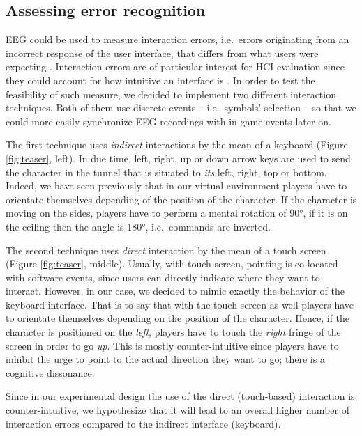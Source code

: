\documentclass[]{sigchi}
\begin{document}
\subsection{Assessing error
recognition}\label{assessing-error-recognition}

EEG could be used to measure interaction errors, i.e.~errors originating
from an incorrect response of the user interface, that differs from what
users were expecting \citep{Ferrez2008}. Interaction errors are of
particular interest for HCI evaluation since they could account for how
intuitive an interface is \citep{Frey2014a}. In order to test the
feasibility of such measure, we decided to implement two different
interaction techniques. Both of them use discrete events --
i.e.~symbols' selection -- so that we could more easily synchronize EEG
recordings with in-game events later on.

The first technique uses \emph{indirect} interactions by the mean of a
keyboard (Figure \ref{fig:teaser}, left). In due time, left, right, up
or down arrow keys are used to send the character in the tunnel that is
situated to \emph{its} left, right, top or bottom. Indeed, we have seen
previously that in our virtual environment players have to orientate
themselves depending of the position of the character. If the character
is moving on the sides, players have to perform a mental rotation of
90°, if it is on the ceiling then the angle is 180°, i.e.~commands are
inverted.

The second technique uses \emph{direct} interaction by the mean of a
touch screen (Figure \ref{fig:teaser}, middle). Usually, with touch
screen, pointing is co-located with software events, since users can
directly indicate where they want to interact. However, in our case, we
decided to mimic exactly the behavior of the keyboard interface. That is
to say that with the touch screen as well players have to orientate
themselves depending on the position of the character. Hence, if the
character is positioned on the \emph{left}, players have to touch the
\emph{right} fringe of the screen in order to go \emph{up}. This is
mostly counter-intuitive since players have to inhibit the urge to point
to the actual direction they want to go; there is a cognitive
dissonance.

Since in our experimental design the use of the direct (touch-based)
interaction is counter-intuitive, we hypothesize that it will lead to an
overall higher number of interaction errors compared to the indirect
interface (keyboard).
\end{document}
